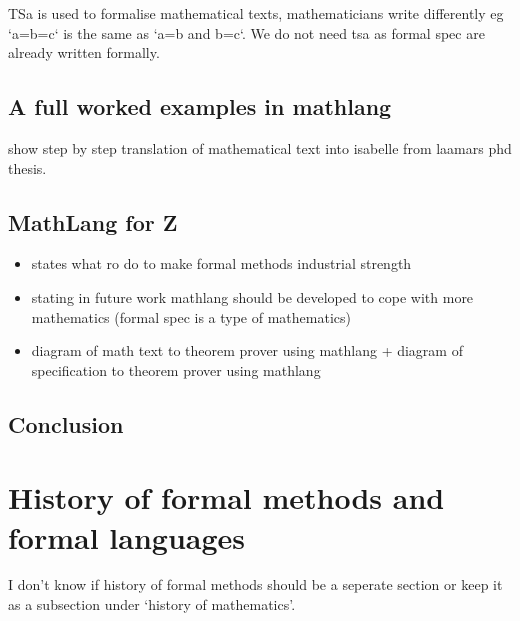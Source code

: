 TSa is used to formalise mathematical texts, mathematicians write differently eg `a=b=c` is the same as `a=b and b=c`. We do not need tsa as formal spec are already written formally.

\subsection{A full worked examples in mathlang}

show step by step translation of mathematical text into isabelle from laamars phd thesis.

\subsection{MathLang for Z}

\begin{itemize}
\item \cite{fmpresetation} states what ro do to make formal methods industrial strength

\item \cite{lamarphd} stating in future work mathlang should be developed to cope with more mathematics (formal spec is a type of mathematics)

\item diagram of math text to theorem prover using mathlang + diagram of specification to theorem prover using mathlang
\end{itemize}

\subsection{Conclusion}

\section{History of formal methods and formal languages}

{\color{red}I don't know if history of formal methods should be a seperate section or keep it as a subsection under `history of mathematics'.}

